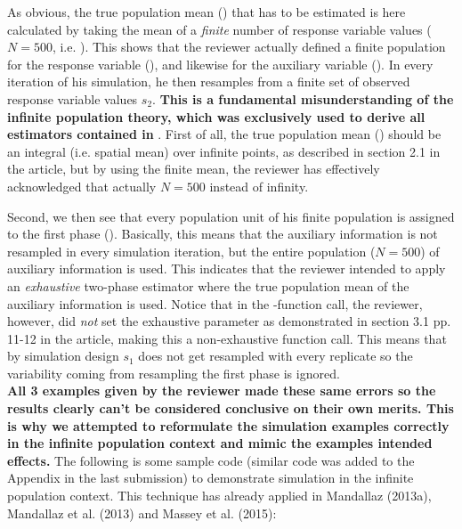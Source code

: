 \documentclass{article}
\begin{document}
As obvious, the true population mean () that has to be estimated is here calculated by taking the mean of a \textit{finite} number of response variable values ($N=500$, i.e. ). This shows that the reviewer actually defined a finite population for the response variable (), and likewise for the auxiliary variable (). In every iteration of his simulation, he then resamples from a finite set of observed response variable values $s_2$. \textbf{This is a fundamental misunderstanding of the infinite population theory, which was exclusively used to derive all estimators contained in }. First of all, the true population mean () should be an integral (i.e. spatial mean) over infinite points, as described in section 2.1 in the article, but by using the finite mean, the reviewer has effectively acknowledged that actually $N=500$ instead of infinity.\par
Second, we then see that every population unit of his finite population is assigned to the first phase (). Basically, this means that the auxiliary information is not resampled in every simulation iteration, but the entire population ($N=500$) of auxiliary information  is used. This indicates that the reviewer intended to apply an \textit{exhaustive} two-phase estimator where the true population mean of the auxiliary information is used. Notice that in the -function call, the reviewer, however, did \textit{not} set the exhaustive parameter as demonstrated in section 3.1 pp. 11-12 in the article, making this a non-exhaustive function call. This means that by simulation design $s_1$ does not get resampled with every replicate so the variability coming from resampling the first phase is ignored.\\

\textbf{All 3 examples given by the reviewer made these same errors so the results clearly can't be considered conclusive on their own merits.  This is why we attempted to reformulate the simulation examples correctly in the infinite population context and mimic the examples intended effects.} The following is some sample code (similar code was added to the Appendix in the last submission) to demonstrate simulation in the infinite population context.  This technique has already applied in Mandallaz (2013a), Mandallaz et al. (2013) and Massey et al. (2015):
\end{document}
